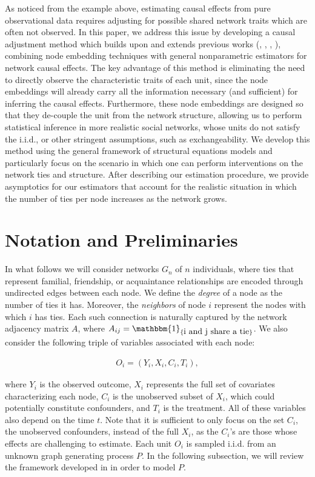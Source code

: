\documentclass{article}
\begin{document}
As noticed from the example above, estimating causal effects from pure observational data requires adjusting for possible shared network traits which are often not observed. In this paper, we address this issue by developing a causal adjustment method which builds upon and extends previous works (\cite{Veitch:Wang:Blei:2019}, \cite{Ogburn:VanderWeele:2017}, \cite{Ogburn:2018}, \cite{Ogburn:Sofrygin:Diaz:vanderLaan:2017}), combining node embedding techniques with general nonparametric estimators for network causal effects. The key advantage of this method is eliminating the need to directly observe the characteristic traits of each unit, since the node embeddings will already carry all the information necessary (and sufficient) for inferring the causal effects. Furthermore, these node embeddings are designed so that they de-couple the unit from the network structure, allowing us to perform statistical inference in more realistic social networks, whose units do not satisfy the i.i.d., or other stringent assumptions, such as exchangeability. We develop this method using the general framework of structural equations models and particularly focus on the scenario in which one can perform interventions on the network ties and structure. After describing our estimation procedure, we provide asymptotics for our estimators that account for the realistic situation in which the number of ties per node increases as the network grows. 


\section{Notation and Preliminaries}

In what follows we will consider networks $G_n$ of $n$ individuals, where ties that represent familial, friendship, or acquaintance relationships are encoded through undirected edges between each node. We define the \textit{degree} of a node as the number of ties it has. Moreover, the \textit{neighbors} of node $i$ represent the nodes with which $i$ has ties. Each such connection is naturally captured by the network adjacency matrix $A$, where $A_{ij} = \mathbbm{1}_{\{\mbox{i and j share a tie}\}}$. We also consider the following triple of variables associated with each node:

\begin{align*}
O_i = (Y_i, X_i, C_i, T_i),
\end{align*}

\noindent where $Y_i$ is the observed outcome, $X_i$ represents the full set of covariates characterizing each node, $C_i$ is the unobserved subset of $X_i$, which could potentially constitute confounders, and $T_i$ is the treatment. All of these variables also depend on the time $t$. Note that it is sufficient to only focus on the set $C_i$, the unobserved confounders, instead of the full $X_i$, as the $C_i$'s are those whose effects are challenging to estimate. Each unit $O_i$ is sampled i.i.d. from an unknown graph generating process $P$. In the following subsection, we will review the framework developed in \cite{Ogburn:Sofrygin:Diaz:vanderLaan:2017} in order to model $P$. 
\end{document}
